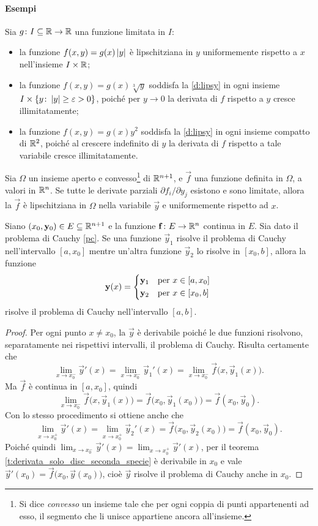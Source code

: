 \paragraph{Esempi}
Sia $g\colon I\subseteq\mathbb{R}\to\mathbb{R}$ una funzione limitata in $I$:
\begin{itemize}
\item la funzione $f(x,y)=g(x)\left|{y}\right|$ è lipschitziana in $y$ uniformemente rispetto a $x$ nell'insieme $I\times\mathbb{R}$;
\item la funzione $f(x,y)=g(x)\sqrt[3]{y}$ soddisfa la \ref{d:lipsy} in ogni insieme $I\times\{y\colon\left|{y}\right|\geq\varepsilon>0\}$, poiché per $y\to 0$ la derivata di $f$ rispetto a $y$ cresce illimitatamente;
\item la funzione $f(x,y)=g(x)y^2$ soddisfa la \ref{d:lipsy} in ogni insieme compatto di $\mathbb{R}^2$, poiché al crescere indefinito di $y$ la derivata di $f$ rispetto a tale variabile cresce illimitatamente.
\end{itemize}
\begin{osservazione}
Sia $\Omega$ un insieme aperto e convesso\footnote{Si dice \emph{convesso} un insieme tale che per ogni coppia di punti appartenenti ad esso, il segmento che li unisce appartiene ancora all'insieme.} di $\mathbb{R}^{n+1}$, e $\vec f$ una funzione definita in $\Omega$, a valori in $\mathbb{R}^n$. Se tutte le derivate parziali $\partial f_i/\partial y_j$ esistono e sono limitate, allora la $\vec f$ è lipschitziana in $\Omega$ nella variabile $\vec y$ e uniformemente rispetto ad $x$.
\end{osservazione}
\begin{lemma}[di saldatura] \label{l:saldatura}
Siano $(x_0,\mathbf{y}_0)\in E\subseteq\mathbb{R}^{n+1}$ e la funzione $\mathbf{f}\colon E\to\mathbb{R}^n$ continua in $E$. Sia dato il problema di Cauchy \eqref{pc}. Se una funzione $\vec y_1$ risolve il problema di Cauchy nell'intervallo $[a,x_0]$ mentre un'altra funzione $\vec y_2$ lo risolve in $[x_0,b]$, allora la funzione
\[
\vec y(x)=\begin{cases*}
\vec y_1&per $x\in[a,x_0]$\\
\vec y_2&per $x\in[x_0,b]$
\end{cases*}\]
risolve il problema di Cauchy nell'intervallo $[a,b]$.
\end{lemma}
\begin{proof}
Per ogni punto $x\neq x_0$, la $\vec y$ è derivabile poiché le due funzioni risolvono, separatamente nei rispettivi intervalli, il problema di Cauchy. Risulta certamente che
\[
\lim_{x\to x_0^-}\vec y'(x)=\lim_{x\to x_0^-}\vec y_1'(x)=\lim_{x\to x_0^-}\vec f\big(x,\vec y_1(x)\big).
\]
Ma $\vec f$ è continua in $[a,x_0]$, quindi 
\[
\lim_{x\to x_0^-}\vec f\big(x,\vec y_1(x)\big)=\vec f\big(x_0,\vec y_1(x_0)\big)=\vec f(x_0,\vec y_0).
\]
Con lo stesso procedimento si ottiene anche che
\[
\lim_{x\to x_0^+}\vec y'(x)=\lim_{x\to x_0^+}\vec y_2'(x)=\vec f\big(x_0,\vec y_2(x_0)\big)=\vec f(x_0,\vec y_0).
\]
Poiché quindi $\lim_{x\to x_0^-}\vec y'(x)=\lim_{x\to x_0^+}\vec y'(x)$, per il teorema \ref{t:derivata_solo_disc_seconda_specie} è derivabile in $x_0$ e vale $\vec y'(x_0)=\vec f\big(x_0,\vec y(x_0)\big)$, cioè $\vec y$ risolve il problema di Cauchy anche in $x_0$.
\end{proof}

